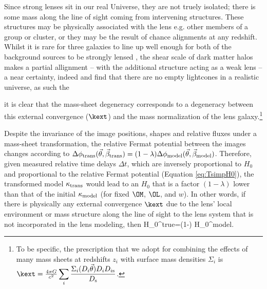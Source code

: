 \documentclass[useAMS,usenatbib]{mn2e}
\begin{document}
Since strong lenses sit in our real Universe, they are not truely isolated;
there is some mass along the line of sight coming from intervening structures.
These structures may be physically associated with the lens e.g. other members
of a group or cluster, or they may be the result of chance alignments at any redshift. 
Whilst it is rare for three galaxies to line up well enough for both of the background sources
to be strongly lensed \citep{gavazzi2008,collett2012}, the shear scale of dark matter halos
makes a partial allignment -- with the additional structure acting as a weak lens -- 
a near certainty, indeed \citet{valewhite2003} and \citet{hilbert2007} find that there
are no empty lightcones in a realistic universe, as such the 

it is clear that 
the mass-sheet degeneracy corresponds to a degeneracy between this
external convergence ($\kext$) and the mass normalization of the lens 
galaxy.\footnote{To be specific, the prescription that we adopt for
  combining the effects of many mass sheets at redshifts $z_i$ with
  surface mass densities $\Sigma_i$ is $\kext=\frac{4\pi
    G}{c^2}\displaystyle\sum_i\frac{\Sigma_i(D_i\vec\theta)D_i D_{i{\rm s}}}{D_{\rm s}}$.}

Despite the invariance of the image positions, shapes and relative fluxes
under a mass-sheet transformation, the relative Fermat potential between the
images changes according to $\Delta \phi_{\rm trans}(\vec{\theta},
\vec{\beta}_{\rm trans}) = (1-\lambda) \Delta \phi_{\rm
  model}(\vec{\theta},\vec{\beta}_{\rm model})$.  Therefore, given measured
relative time delays $\Delta t$, which are inversely proportional to $H_0$ and
proportional to the relative Fermat potential (Equation \ref{eq:TsimpH0}), the
transformed model $\kappa_{\rm trans}$ would lead to an $H_0$ that is a factor
$(1-\lambda)$ lower than that of the initial $\kappa_{\rm model}$ (for fixed
$\OM$, $\OL$, and $w$).  In other words, if there is physically any external
convergence $\kext$ due to the lens' local environment or mass structure along the
line of sight
to the lens system that is not incorporated in the lens
modeling, then
\be 
\label{eq:MassSheet:H0bias}
H_0^{\rm{true}}=(1-\kext) H_0^{\rm{model}}.
\ee
\end{document}
